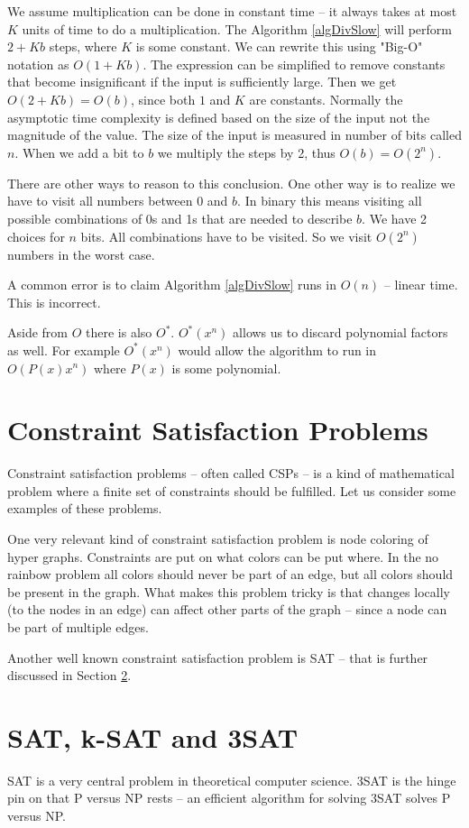 \documentclass[msc,lith,english]{liuthesis}
\begin{document}
We assume multiplication can be done in constant time -- it always takes at most $K$ units of time to do a multiplication.
The Algorithm \ref{algDivSlow} will perform $ 2 + Kb $ steps, where $K$ is some
constant. We can rewrite this using "Big-O" notation as $O(1 + Kb)$. The expression can be
simplified to remove constants that become insignificant if the
input is sufficiently large. Then we get $O(2 + Kb) = O(b)$, since both $1$ and $K$ are constants. 
Normally the asymptotic time complexity is defined based on the size of the input not the magnitude of the value.
The size of the input is measured in number of bits called $n$. When we add a bit to $b$ we multiply the steps by 2,
thus $O(b) = O(2^n)$.

There are other ways to reason to this conclusion.
One other way is to realize we have to visit all numbers between $0$ and $b$.
In binary this means visiting all possible combinations of 0s and 1s that are needed to describe $b$.
We have 2 choices for $n$ bits. All combinations have to be visited. So we visit $O(2^n)$ numbers in the worst case. 

A common error is to claim Algorithm \ref{algDivSlow} runs in $O(n)$ -- linear time. This is incorrect.

Aside from $O$ there is also $O^*$. $O^*(x^n)$ allows us to discard polynomial factors as well. For example $O^*(x^n)$ would allow the algorithm to run in $O(P(x)x^n)$ where $P(x)$ is some polynomial.

\section{Constraint Satisfaction Problems}
Constraint satisfaction problems -- often called CSPs -- is a kind of mathematical problem where a finite set of constraints should be fulfilled. Let us consider some examples of these problems.

One very relevant kind of constraint satisfaction problem is node coloring of hyper graphs.
Constraints are put on what colors can be put where. In the no rainbow problem all colors should never be part of an edge, but all colors should be present in the graph. What makes this problem tricky is that changes locally (to the nodes in an edge) can affect other parts of the graph -- since a node can be part of multiple edges.

Another well known constraint satisfaction problem is SAT -- that is further discussed in Section \ref{secSAT}.

\section{SAT, k-SAT and 3SAT}\label{secSAT}
SAT is a very central problem in theoretical computer science. 3SAT is the
hinge pin on that P versus NP rests -- an efficient algorithm for solving 3SAT
solves P versus NP.
\end{document}

